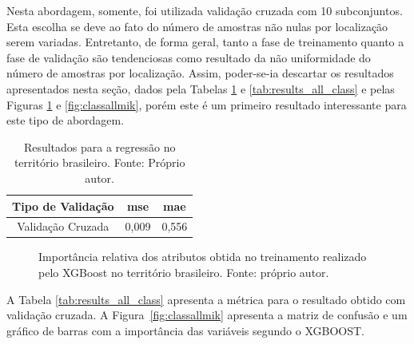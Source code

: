 Nesta abordagem, somente, foi utilizada validação cruzada com 10 subconjuntos. Esta escolha se deve ao fato do número de amostras não nulas por localização serem variadas. Entretanto, de forma geral, tanto a fase de treinamento quanto a fase de validação são tendenciosas como resultado da não uniformidade do número de amostras por localização. Assim, poder-se-ia descartar os resultados apresentados nesta seção, dados pela Tabelas \ref{tab:results_all_reg} e \ref{tab:results_all_class}  e pelas Figuras \ref{fig:regall} e \ref{fig:classallmik}, porém este é um primeiro resultado interessante para este tipo de abordagem.

\begin{table}[H]
\begin{center}
\begin{tabular}{|c|c|c|}
\hline
Tipo de Validação & mse       & mae   \\ \hline
Validação Cruzada                   & 0,009   & 0,556  \\ \hline
\end{tabular}
\end{center}
\vspace{12pt}
\caption{Resultados para a regressão no território brasileiro. Fonte: Próprio autor.}
\label{tab:results_all_reg}
\end{table}

\begin{figure}[H]
\center
{}
\caption{Importância relativa dos atributos obtida no treinamento realizado pelo XGBoost no território brasileiro. Fonte: próprio autor.}\label{fig:regall}
\end{figure}

A Tabela \ref{tab:results_all_class} apresenta a métrica para o resultado obtido com validação cruzada. A Figura\ \ref{fig:classallmik} apresenta a matriz de confusão e um gráfico de barras com a importância das variáveis segundo o XGBOOST.

